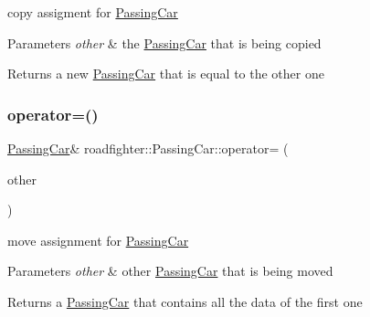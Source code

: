 copy assigment for \hyperlink{classroadfighter_1_1PassingCar}{Passing\+Car} 
\begin{DoxyParams}{Parameters}
{\em other} & the \hyperlink{classroadfighter_1_1PassingCar}{Passing\+Car} that is being copied \\
\hline
\end{DoxyParams}
\begin{DoxyReturn}{Returns}
a new \hyperlink{classroadfighter_1_1PassingCar}{Passing\+Car} that is equal to the other one 
\end{DoxyReturn}
\mbox{\label{classroadfighter_1_1PassingCar_a5cae5b484691e5975d2b9d59254108ad}} 
\subsubsection{\texorpdfstring{operator=()}{operator=()}\hspace{0.1cm}{\footnotesize\ttfamily [2/2]}}
{\footnotesize\ttfamily \hyperlink{classroadfighter_1_1PassingCar}{Passing\+Car}\& roadfighter\+::\+Passing\+Car\+::operator= (\begin{DoxyParamCaption}\item[{\hyperlink{classroadfighter_1_1PassingCar}{Passing\+Car} \&\&}]{other }\end{DoxyParamCaption})\hspace{0.3cm}{\ttfamily [default]}}

move assignment for \hyperlink{classroadfighter_1_1PassingCar}{Passing\+Car} 
\begin{DoxyParams}{Parameters}
{\em other} & other \hyperlink{classroadfighter_1_1PassingCar}{Passing\+Car} that is being moved \\
\hline
\end{DoxyParams}
\begin{DoxyReturn}{Returns}
a \hyperlink{classroadfighter_1_1PassingCar}{Passing\+Car} that contains all the data of the first one 
\end{DoxyReturn}
\mbox{\label{classroadfighter_1_1PassingCar_ac04b801b789bf880011d5cdb1ffdec59}} 
